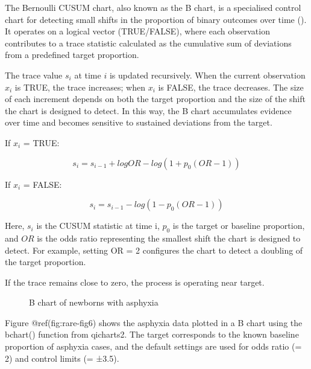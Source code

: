 \documentclass[
]{book}
\makeatletter
\newenvironment{Shaded}{\begin{snugshade}}{\end{snugshade}}
\newcommand{\AttributeTok}[1]{\textcolor[rgb]{0.13,0.29,0.53}{#1}}
\newcommand{\DecValTok}[1]{\textcolor[rgb]{0.00,0.00,0.81}{#1}}
\newcommand{\FloatTok}[1]{\textcolor[rgb]{0.00,0.00,0.81}{#1}}
\newcommand{\FunctionTok}[1]{\textcolor[rgb]{0.13,0.29,0.53}{\textbf{#1}}}
\newcommand{\NormalTok}[1]{#1}
\newcommand{\SpecialCharTok}[1]{\textcolor[rgb]{0.81,0.36,0.00}{\textbf{#1}}}
\newcommand*\pandocbounded[1]{%
  \sbox\pandoc@box{#1}%
  \Gscale@div\@tempa{\textheight}{\dimexpr\ht\pandoc@box+\dp\pandoc@box\relax}%
  \Gscale@div\@tempb{\linewidth}{\wd\pandoc@box}%
  \ifdim\@tempb\p@<\@tempa\p@\let\@tempa\@tempb\fi%
  \ifdim\@tempa\p@<\p@\scalebox{\@tempa}{\usebox\pandoc@box}%
  \else\usebox{\pandoc@box}%
  \fi%
}
\makeatother
\begin{document}
The Bernoulli CUSUM chart, also known as the B chart, is a specialised
control chart for detecting small shifts in the proportion of binary
outcomes over time (). It operates on a logical vector (TRUE/FALSE), where each
observation contributes to a trace statistic calculated as the
cumulative sum of deviations from a predefined target proportion.

The trace value \(s_i\) at time \(i\) is updated recursively. When the
current observation \(x_i\) is TRUE, the trace increases; when \(x_i\)
is FALSE, the trace decreases. The size of each increment depends on
both the target proportion and the size of the shift the chart is
designed to detect. In this way, the B chart accumulates evidence over
time and becomes sensitive to sustained deviations from the target.

If \(x_i\) = TRUE:

\[s_i=s_{i-1}+logOR-log(1+p_0(OR-1))\]

If \(x_i\) = FALSE:

\[s_i=s_{i-1}-log(1-p_0(OR-1))\]

Here, \(s_i\) is the CUSUM statistic at time i, \(p_0\) is the target or
baseline proportion, and \(OR\) is the odds ratio representing the
smallest shift the chart is designed to detect. For example, setting OR
= 2 configures the chart to detect a doubling of the target proportion.

If the trace remains close to zero, the process is operating near
target.

\begin{Shaded}
\end{Shaded}

\begin{figure}
\centering
\pandocbounded{}
\caption{B chart of newborns with asphyxia}
\end{figure}

Figure @ref(fig:rare-fig6) shows the asphyxia data plotted in a B chart
using the bchart() function from qicharts2. The target corresponds to
the known baseline proportion of asphyxia cases, and the default
settings are used for odds ratio (= 2) and control limits (= ±3.5).
\end{document}
